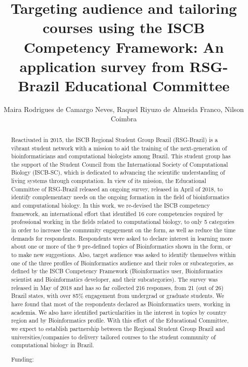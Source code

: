 \documentclass[twoside]{article}
\title{\vspace{-15mm}\fontsize{24pt}{10pt}\selectfont\textbf{ Targeting audience and tailoring courses using the ISCB Competency Framework: An application survey from RSG-Brazil Educational Committee }} %
\author{ Maira Rodrigues de Camargo Neves, Raquel Riyuzo de Almeida Franco, Nilson Coimbra }
\affil{ Universidade Federal de Minas Gerais }
\date{}
\begin{document}
  
  
  \maketitle %
  
  
  \thispagestyle{fancy} %
  
  
  \begin{abstract}
  Reactivated in 2015,  the ISCB Regional Student Group Brazil (RSG-Brazil) is a vibrant student network with a mission to aid the training of the next-generation of bioinformaticians and computational biologists among Brazil. This student group has the support of the Student Council from the International Society of Computational Biology (ISCB-SC),  which is dedicated to advancing the scientific understanding of living systems through computation. In view of its mission,  the Educational Committee of RSG-Brazil released an ongoing survey,  released in April of 2018,  to identify complementary needs on the ongoing formation in the field of bioinformatics and computational biology. In this work,  we re-devised the ISCB competency framework,  an international effort that identified 16 core competencies required by professional working in the fields related to computational biology,  to only 5 categories in order to increase the community engagement on the form,  as well as reduce the time demands for respondents. Respondents were asked to declare interest in learning more about one or more of the 9 pre-defined topics of Bioinformatics shown in the form,  or to make new suggestions. Also,  target audience was asked to identify themselves within one of the three profiles of Bioinformatics audience and their roles or subcategories,  as defined by the ISCB Competency Framework (Bioinformatics user,  Bioinformatics scientist and Bioinformatics developer,  and their subcategories). The survey was released in May of 2018 and has so far collected 216 responses,  from 21 (out of 26) Brazil states,  with over 85\% engagement from undergrad or graduate students. We have found that most of the respondents declared as Bioinformatics users,  working in academia. We also have identified particularities in the interest in topics by country region and by Bioinformatics profile. With this effort of the Educational Committee,  we expect to establish partnership between the Regional Student Group Brazil and universities/companies to delivery tailored courses to the student community of computational biology in Brazil.
  
  Funding:  \\ 
  \end{abstract}
  
\end{document}
